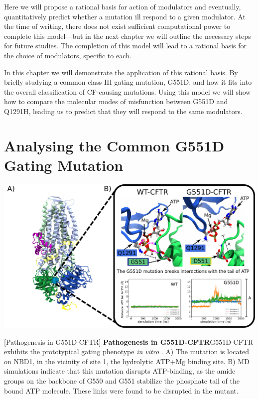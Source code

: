 Here we will propose a rational basis for action of modulators and eventually, quantitatively predict whether a mutation ill respond to a given modulator. At the time of writing, there does not exist sufficient computational power to complete this model---but in the next chapter we will outline the necessary steps for future studies. The completion of this model will lead to a rational basis for the choice of modulators, specific to each. 

In this chapter we will demonstrate the application of this rational basis. By briefly studying a common class III gating mutation, G551D, and how it fits into the overall classification of CF-causing mutations. Using this model we will show how to compare the molecular modes of misfunction between G551D and Q1291H, leading us to predict that they will respond to the same modulators. 

\section{Analysing the Common G551D Gating Mutation}

	\begin{center}
		\includegraphics[width=\textwidth]{figures/perspective/G551D.pdf}
	\end{center}

\begingroup
\captionsetup{singlelinecheck = false, justification=raggedright}
[Pathogenesis in G551D-CFTR] {\textbf{Pathogenesis in G551D-CFTR}}{G551D-CFTR exhibits the prototypical gating phenotype \textit{in vitro} \cite{bompadre2007, wang2020}. A) The mutation is located on NBD1, in the vicinity of site 1, the hydrolytic ATP+Mg binding site. B) MD simulations indicate that this mutation disrupts ATP-binding, as the amide groups on the backbone of G550 and G551 stabilize the phosphate tail of the bound ATP molecule. These links were found to be disrupted in the mutant.} 
\label{G551D_results}
\endgroup

